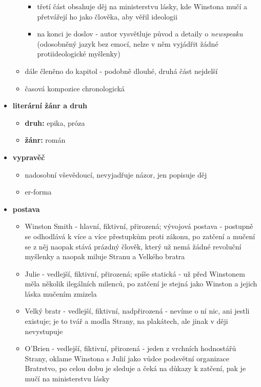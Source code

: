 \documentclass[11pt]{article}
\begin{document}
\begin{itemize}
\begin{itemize}
\begin{itemize}
                \item třetí část obsahuje děj na ministerstvu lásky, kde Winstona mučí a přetvářejí ho jako člověka, aby věřil ideologii
                \item na konci je doslov - autor vysvětluje původ a detaily o \textit{newspeaku} (odosobněný jazyk bez emocí, nelze v něm vyjádřit žádné protiideologické myšlenky)
            \end{itemize}
            \item dále členěno do kapitol - podobně dlouhé, druhá část nejdelší
            \item časová kompozice chronologická
        \end{itemize}
        \item\textbf{literární žánr a druh}
        \begin{itemize}
            \item \textbf{druh: }epika, próza
            \item \textbf{žánr: }román
        \end{itemize}
        \item\textbf{vypravěč}
        \begin{itemize}
            \item nadosobní vševědoucí, nevyjadřuje názor, jen popisuje děj
            \item er-forma
        \end{itemize}
        \item\textbf{postava}
        \begin{itemize}
            \item Winston Smith - hlavní, fiktivní, přirozená; vývojová postava - postupně se odhodlává k více a více přestupkům proti zákonu, po zatčení a mučení se z něj naopak stává prázdný člověk, který už nemá žádné revoluční myšlenky a naopak miluje Stranu a Velkého bratra
            \item Julie - vedlejší, fiktivní, přirozená; spíše statická - už před Winstonem měla několik ilegálních milenců, po zatčení je stejná jako Winston a jejich láska mučením zmizela
            \item Velký bratr - vedlejší, fiktivní, nadpřirozená - nevíme o ní nic, ani jestli existuje; je to tvář a modla Strany, na plakátech, ale jinak v ději nevystupuje
            \item O'Brien - vedlejší, fiktivní, přirozená - jeden z vrchních hodnostářů Strany, oklame Winstona s Julií jako vůdce podsvětní organizace Bratrstvo, po celou dobu je sleduje a čeká na důkazy k zatčení, pak je mučí na ministerstvu lásky

\end{itemize}
\end{itemize}
\end{document}
